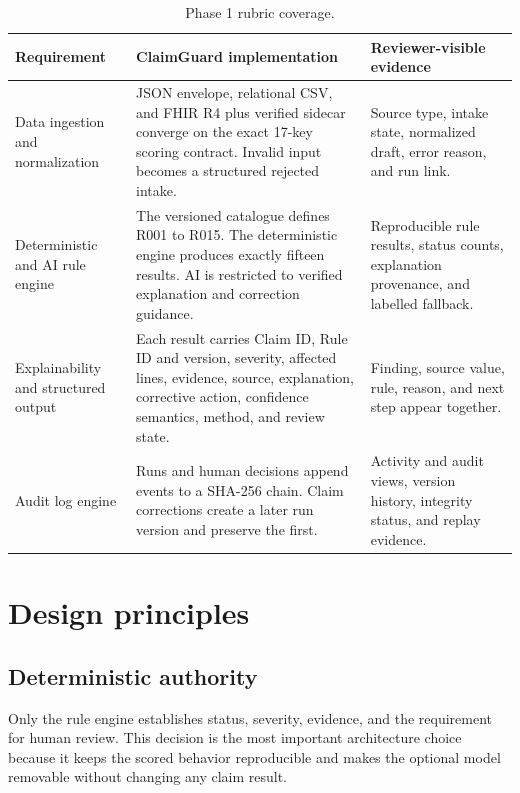 \documentclass[11pt,a4paper,oneside]{report}
\begin{document}
\begin{table}[H]
\centering
\caption{Phase 1 rubric coverage.}
\label{tab:rubric}
\begin{tabularx}{\textwidth}{>{\raggedright\arraybackslash}p{32mm} >{\raggedright\arraybackslash}X >{\raggedright\arraybackslash}p{34mm}}
\toprule
\textbf{Requirement} & \textbf{ClaimGuard implementation} & \textbf{Reviewer-visible evidence}\\
\midrule
Data ingestion and normalization & JSON envelope, relational CSV, and FHIR R4 plus verified sidecar converge on the exact 17-key scoring contract. Invalid input becomes a structured rejected intake. & Source type, intake state, normalized draft, error reason, and run link.\\
Deterministic and AI rule engine & The versioned catalogue defines R001 to R015. The deterministic engine produces exactly fifteen results. AI is restricted to verified explanation and correction guidance. & Reproducible rule results, status counts, explanation provenance, and labelled fallback.\\
Explainability and structured output & Each result carries Claim ID, Rule ID and version, severity, affected lines, evidence, source, explanation, corrective action, confidence semantics, method, and review state. & Finding, source value, rule, reason, and next step appear together.\\
Audit log engine & Runs and human decisions append events to a SHA-256 chain. Claim corrections create a later run version and preserve the first. & Activity and audit views, version history, integrity status, and replay evidence.\\
\bottomrule
\end{tabularx}
\end{table}

\section{Design principles}

\subsection{Deterministic authority}
Only the rule engine establishes status, severity, evidence, and the requirement for human review. This decision is the most important architecture choice because it keeps the scored behavior reproducible and makes the optional model removable without changing any claim result.
\end{document}
